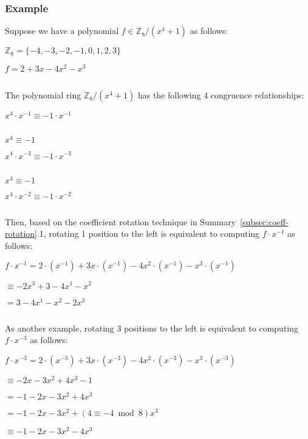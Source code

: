 \subsubsection{Example}
\label{subsec:coeff-rotation-ex}

Suppose we have a polynomial $f \in \mathbb{Z}_8 / (x^4 + 1)$ as follows:

$\mathbb{Z}_8 = \{-4, -3, -2, -1, 0, 1, 2, 3\}$

$f = 2 + 3x - 4x^2 -x^3$




$ $

The polynomial ring $\mathbb{Z}_8 / (x^4 + 1)$ has the following 4  congruence relationships: 

{}

$x^4 \cdot x^{-1} \equiv -1 \cdot x^{-1}$

{}

$ $

$x^4 \equiv -1$

$x^4 \cdot x^{-3} \equiv -1 \cdot x^{-3}$

{}

$ $

$x^4 \equiv -1$

$x^4 \cdot x^{-2} \equiv -1 \cdot x^{-2}$

{}

$ $



Then, based on the coefficient rotation technique in Summary~\ref*{subsec:coeff-rotation}.1, rotating 1 position to the left is equivalent to computing $f \cdot x^{-1}$ as follows:

$f\cdot x^{-1} = 2\cdot(x^{-1}) + 3x\cdot(x^{-1}) - 4x^2\cdot(x^{-1}) - x^3\cdot(x^{-1})$

$\equiv -2x^{3} + 3 - 4x^1 - x^2$

$= 3 - 4x^1 - x^2 -2x^{3}$

$ $

As another example, rotating 3 positions to the left is equivalent to computing $f \cdot x^{-3}$ as follows:

$f\cdot x^{-3} = 2\cdot(x^{-3}) + 3x\cdot(x^{-3}) - 4x^2\cdot(x^{-3}) - x^3\cdot(x^{-3})$

$\equiv -2x - 3x^2 + 4x^3 - 1$

$= -1 - 2x - 3x^2 + 4x^3$

$= -1 - 2x - 3x^2 + (4 \equiv -4 \bmod 8) x^3$

$\equiv -1 - 2x - 3x^2 -4x^3$